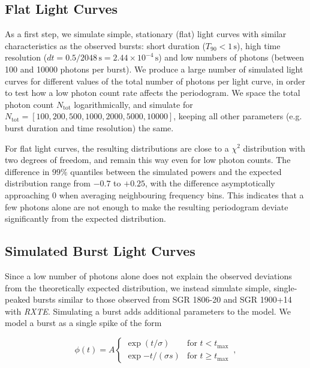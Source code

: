 \documentclass[numberedappendix]{emulateapj}
\newcommand{\project}[1]{\textsl{#1}}
\newcommand{\rxte}{\project{RXTE}}
\begin{document}
\subsection{Flat Light Curves}
\label{sec:analysis_lcsims}
As a first step, we simulate simple, stationary (flat) light curves with similar characteristics as the observed bursts: short duration ($T_{90} < 1 \, \mathrm{s}$), high time resolution ($dt = 0.5/2048 \, \mathrm{s} = 2.44\times 10^{-4} \, \mathrm{s}$) and low numbers of photons (between 100 and 10000 photons per burst). 
We produce a large number of simulated light curves for different values of the total number of photons per light curve, in order to test how a low photon count rate affects the periodogram. We space the total photon count $N_{\mathrm{tot}}$ logarithmically, and simulate for $N_{\mathrm{tot}} = [100, 200, 500, 1000, 2000, 5000, 10000]$, keeping all other parameters (e.g. burst duration and time resolution) the same.


For flat light curves, the resulting distributions are close to a $\chi^2$ distribution with two degrees of freedom, and remain this way even for low photon counts. The difference in $99\%$ quantiles between the simulated powers and the expected distribution range from $-0.7$ to $+0.25$, with the difference asymptotically approaching $0$ when averaging neighbouring frequency bins.
This indicates that a few photons alone are not enough to make the resulting periodogram deviate significantly from the expected distribution.



\subsection{Simulated Burst Light Curves}
\label{sec:weakburstsims}



Since a low number of photons alone does not explain the observed deviations from the theoretically expected distribution, we instead simulate simple, single-peaked bursts similar to those observed from SGR 1806-20 and SGR 1900+14 with \rxte.
Simulating a burst adds additional parameters to the model. We model a burst as a single spike of the form

\begin{equation}
\phi(t) = A \left\{\begin{array}{ll}\exp(t/\sigma) & \mbox{for $t<t_\mathrm{max}$}\\ \exp{-t/(\sigma s)} & \mbox{for $t\geq t_{\mathrm{max}}$}\end{array}\right. \, ,
\label{eqn:spikemodel}
\end{equation}
\end{document}
